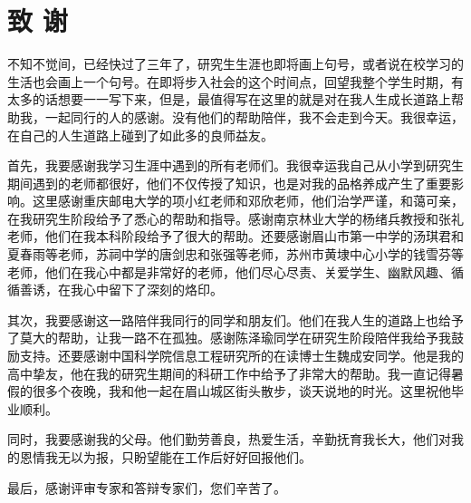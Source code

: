 \chapter{致 \quad 谢}
\thispagestyle{others}
\pagestyle{others}
\xiaosi

不知不觉间，已经快过了三年了，研究生生涯也即将画上句号，或者说在校学习的生活也会画上一个句号。在即将步入社会的这个时间点，回望我整个学生时期，有太多的话想要一一写下来，但是，最值得写在这里的就是对在我人生成长道路上帮助我，一起同行的人的感谢。没有他们的帮助陪伴，我不会走到今天。我很幸运，在自己的人生道路上碰到了如此多的良师益友。

首先，我要感谢我学习生涯中遇到的所有老师们。我很幸运我自己从小学到研究生期间遇到的老师都很好，他们不仅传授了知识，也是对我的品格养成产生了重要影响。这里感谢重庆邮电大学的项小红老师和邓欣老师，他们治学严谨，和蔼可亲，在我研究生阶段给予了悉心的帮助和指导。感谢南京林业大学的杨绪兵教授和张礼老师，他们在我本科阶段给予了很大的帮助。还要感谢眉山市第一中学的汤琪君和夏春雨等老师，苏祠中学的唐剑忠和张强等老师，苏州市黄埭中心小学的钱雪芬等老师，他们在我心中都是非常好的老师，他们尽心尽责、关爱学生、幽默风趣、循循善诱，在我心中留下了深刻的烙印。

其次，我要感谢这一路陪伴我同行的同学和朋友们。他们在我人生的道路上也给予了莫大的帮助，让我一路不在孤独。感谢陈泽瑜同学在研究生阶段陪伴我给予我鼓励支持。还要感谢中国科学院信息工程研究所的在读博士生魏成安同学。他是我的高中挚友，他在我的研究生期间的科研工作中给予了非常大的帮助。我一直记得暑假的很多个夜晚，我和他一起在眉山城区街头散步，谈天说地的时光。这里祝他毕业顺利。

同时，我要感谢我的父母。他们勤劳善良，热爱生活，辛勤抚育我长大，他们对我的恩情我无以为报，只盼望能在工作后好好回报他们。

最后，感谢评审专家和答辩专家们，您们辛苦了。




